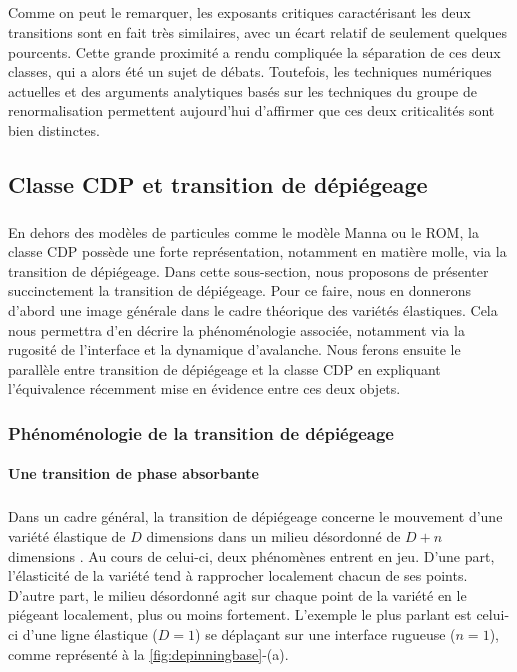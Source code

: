\subparagraph{}Comme on peut le remarquer, les exposants critiques caractérisant les deux transitions sont en fait très similaires, avec un écart relatif de seulement quelques pourcents. Cette grande proximité a rendu compliquée la séparation de ces deux classes, qui a alors été un sujet de débats. Toutefois, les techniques numériques actuelles et des arguments analytiques basés sur les techniques du groupe de renormalisation permettent aujourd'hui d'affirmer que ces deux criticalités sont bien distinctes.

\subsection{Classe CDP et transition de dépiégeage}

\subparagraph{}En dehors des modèles de particules comme le modèle Manna ou le ROM, la classe CDP possède une forte représentation, notamment en matière molle, via la transition de dépiégeage. Dans cette sous-section, nous proposons de présenter succinctement la transition de dépiégeage. Pour ce faire, nous en donnerons d'abord une image générale dans le cadre théorique des variétés élastiques. Cela nous permettra d'en décrire la phénoménologie associée, notamment via la rugosité de l'interface et la dynamique d'avalanche. Nous ferons ensuite le parallèle entre transition de dépiégeage et la classe CDP en expliquant l'équivalence récemment mise en évidence entre ces deux objets.

\subsubsection{Phénoménologie de la transition de dépiégeage}

\paragraph{Une transition de phase absorbante}

\subparagraph{}Dans un cadre général, la transition de dépiégeage concerne le mouvement d'une variété élastique de $D$ dimensions dans un milieu désordonné de $D+n$ dimensions \cite{fisher_collective_1998}. Au cours de celui-ci, deux phénomènes entrent en jeu. D'une part, l'élasticité de la variété tend à rapprocher localement chacun de ses points. D'autre part, le milieu désordonné agit sur chaque point de la variété en le piégeant  localement, plus ou moins fortement. L'exemple le plus parlant est celui-ci d'une ligne élastique ($D=1$) se déplaçant sur une interface rugueuse ($n=1$), comme représenté à la \autoref{fig:depinningbase}-(a).

